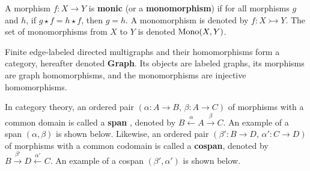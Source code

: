 \begin{definition}
    \label{def:cat:homo}
    A morphism \( f : X \to Y \) is \textbf{monic} (or a \textbf{monomorphism}) if for all morphisms \( g \) and \( h \), if \( g \star f = h \star f \), then \( g = h \). A monomorphism is denoted by \( f : X \rightarrowtail Y \). The set of monomorphisms from $X$ to $Y$ is denoted $\operatorname{Mono}(X,Y)$.
\end{definition} 

\begin{example} 
    Finite edge-labeled directed multigraphs and their homomorphisms form a category, hereafter denoted \textbf{Graph}. Its objects are labeled graphs, its morphisms are graph homomorphisms, and the monomorphisms are injective homomorphisms.
\end{example}

 

In category theory, an ordered pair \((\alpha : A \to B,\, \beta : A \to C)\) of morphisms with a common domain is called a \textbf{span} \cite{lowe2010graph}, denoted by
\(
B \overset{\alpha}{\leftarrow} A \overset{\beta}{\rightarrow} C
\). An example of a span $(\alpha, \beta)$ is shown below.
Likewise, an ordered pair \((\beta' : B \to D,\, \alpha' : C \to D)\) of morphisms with a common codomain is called a \textbf{cospan}, denoted by
\(
B \overset{\beta'}{\rightarrow} D \overset{\alpha'}{\leftarrow} C
\). An example of a cospan $(\beta', \alpha')$ is shown below.

